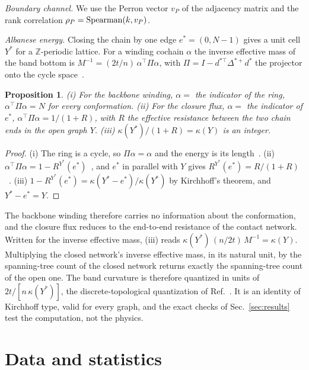 \documentclass[reprint,amsmath,amssymb,aps,pre,longbibliography]{revtex4-2}
\newtheorem{proposition}{Proposition}
\begin{document}
\emph{Boundary channel.} We use the Perron vector $v_P$ of the adjacency matrix and the rank
correlation $\rho_P={\rm Spearman}(k,v_P)$.

\emph{Albanese energy.} Closing the chain by one edge $e^*=(0,N-1)$ gives a unit cell $Y^*$ for a
$\mathbb Z$-periodic lattice. For a winding cochain $\alpha$ the inverse effective mass of the band
bottom is $M^{-1}=(2t/n)\,\alpha^{\top}\Pi\alpha$, with $\Pi=I-d^{*\top}\Delta^{*+}d^*$ the
projector onto the cycle space~\cite[Ch.~22]{ANCCFT}.
\begin{proposition}\label{prop:alb}
(i) For the backbone winding, $\alpha=$ the indicator of the ring, $\alpha^{\top}\Pi\alpha=N$ for
every conformation. (ii) For the closure flux, $\alpha=$ the indicator of $e^*$,
$\alpha^{\top}\Pi\alpha=1/(1+R)$, with $R$ the effective resistance between the two chain ends in
the open graph $Y$. (iii) $\kappa(Y^*)/(1+R)=\kappa(Y)$ is an integer.
\end{proposition}
\begin{proof}
(i) The ring is a cycle, so $\Pi\alpha=\alpha$ and the energy is its length~\cite[Cor.~22.4.3]{ANCCFT}.
(ii) $\alpha^{\top}\Pi\alpha=1-R^{Y^*}(e^*)$~\cite[Thm.~22.4.1]{ANCCFT}, and $e^*$ in parallel with
$Y$ gives $R^{Y^*}(e^*)=R/(1+R)$~\cite{KleinRandic}. (iii) $1-R^{Y^*}(e^*)=\kappa(Y^*-e^*)/\kappa(Y^*)$
by Kirchhoff's theorem, and $Y^*-e^*=Y$.
\end{proof}
\noindent The backbone winding therefore carries no information about the conformation, and the
closure flux reduces to the end-to-end resistance of the contact network. Written for the inverse
effective mass, (iii) reads $\kappa(Y^*)\,(n/2t)\,M^{-1}=\kappa(Y)$. Multiplying the closed
network's inverse effective mass, in its natural unit, by the spanning-tree count of the closed
network returns exactly the spanning-tree count of the open one. The band curvature is therefore
quantized in units of $2t/[n\,\kappa(Y^*)]$, the discrete-topological quantization of
Ref.~\cite[Cor.~22.4.2]{ANCCFT}. It is an identity of Kirchhoff type, valid for every graph, and
the exact checks of Sec.~\ref{sec:results} test the computation, not the physics.

\section{Data and statistics}\label{sec:data}
\end{document}
